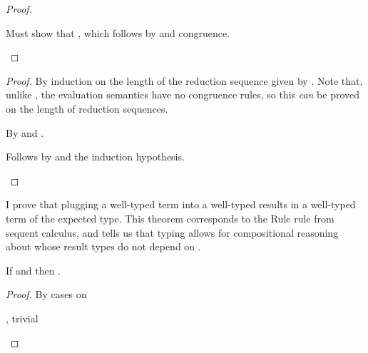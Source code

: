 {\begin{proof}
\begin{proofcases}
    \item {}

      Must show that \im{\tK\hw{\tfste{\tpaire{\tVone}{\tVtwo}}} \equiv
        \tK\hw{\tVone}}, which follows by  and congruence. \qedhere
  \end{proofcases}
\end{proof}

\begin{theorem}
  \label{thm:anf:tgt:eval-sound}
  \im{\sequivjudg{}{\teval{\tM}}{\tM}}
\end{theorem}
\begin{proof}
  By induction on the length  of the reduction sequence given by \im{\teval{\tM}}.
  Note that, unlike , the  evaluation semantics
  have no congruence rules, so this \emph{can} be proved on the length of reduction sequences.
  \begin{proofcases}
    \item {} By  and .
    \item {} Follows by  and the induction hypothesis. \qedhere
  \end{proofcases}
\end{proof}

I prove that plugging a well-typed term into a well-typed  results
in a well-typed term of the expected type.
This theorem corresponds to the Rule  rule from sequent calculus, and
tells us that  typing allows for compositional reasoning about
 \im{\tK\hw{\tN}} whose result types do not
depend on \im{\tN}.
\begin{lemma}[Cut]
  \label{lem:anf:ecca:cut}
  If \im{\styjudg{\tlenv}{\tK}{(\tN : \tA) \Rightarrow \tB}} and
  \im{\styjudg{\tlenv}{\tN}{\tA}} then \im{\styjudg{\tlenv}{\tK\hw{\tN}}{\tB}}.
\end{lemma}
\begin{proof}
  By cases on \im{\styjudg{\tlenv}{\tK}{(\tN : \tA) \Rightarrow \tB}}
  \begin{proofcases}
    \item \im{\styjudg{\tlenv}{\hole}{(\tN : \tA) \Rightarrow \tA}}, trivial
    \item \im{\styjudg{\tlenv}{\tlete{\ty}{\hole}{\tM}}{(\tN : \tA) \Rightarrow \tB}}


\end{proofcases}
\end{proof}}
